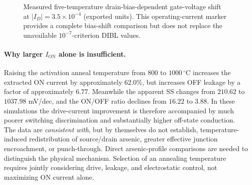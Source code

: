 \begin{figure}[!htbp]\centering
{}
\caption{Measured five-temperature drain-bias-dependent
gate-voltage shift at $|I_D|=3.5\times10^{-4}$
(exported units). This operating-current marker provides
a complete bias-shift comparison but does not replace
the unavailable $10^{-7}$-criterion DIBL values.}
\end{figure}

\paragraph{Why larger $I_{\mathrm{ON}}$ alone is insufficient.}
Raising the activation anneal temperature from $800$ to
$1000\,^\circ$C increases the extracted ON current by approximately
$62.0\%$, but increases OFF leakage by a factor of approximately
$6.77$. Meanwhile the apparent SS changes from $210.62$ to
$1037.98$ mV/dec, and the ON/OFF ratio declines from $16.22$
to $3.88$. In these simulations the drive-current improvement is
therefore accompanied by much poorer switching discrimination
and substantially higher off-state conduction. The data are
\emph{consistent with}, but by themselves do not establish,
temperature-induced redistribution of source/drain arsenic,
greater effective junction encroachment, or punch-through.
Direct arsenic-profile comparisons are needed to distinguish
the physical mechanism. Selection of an annealing temperature
requires jointly considering drive, leakage, and electrostatic
control, not maximizing ON current alone.



